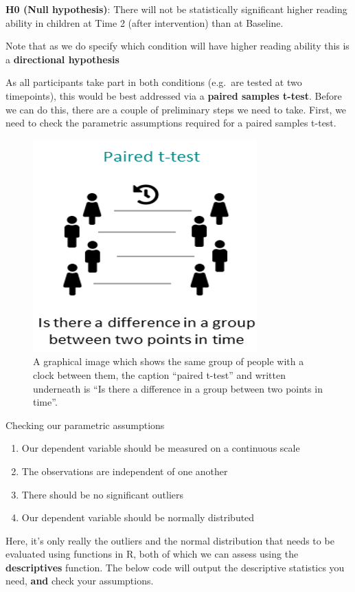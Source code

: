 \documentclass[
]{book}
\begin{document}
\textbf{H0 (Null hypothesis)}: There will not be statistically significant higher reading ability in children at Time 2 (after intervention) than at Baseline.

Note that as we do specify which condition will have higher reading ability this is a \textbf{directional hypothesis}

As all participants take part in both conditions (e.g.~are tested at two timepoints), this would be best addressed via a \textbf{paired samples t-test}. Before we can do this, there are a couple of preliminary steps we need to take. First, we need to check the parametric assumptions required for a paired samples t-test.

\begin{figure}
\centering
\includegraphics{img/05-PairedT-Test.png}
\caption{A graphical image which shows the same group of people with a clock between them, the caption ``paired t-test'' and written underneath is ``Is there a difference in a group between two points in time''.}
\end{figure}

Checking our parametric assumptions

\begin{enumerate}
\def\labelenumi{\alph{enumi}.}
\item
  Our dependent variable should be measured on a continuous scale
\item
  The observations are independent of one another
\item
  There should be no significant outliers
\item
  Our dependent variable should be normally distributed
\end{enumerate}

Here, it's only really the outliers and the normal distribution that needs to be evaluated using functions in R, both of which we can assess using the \textbf{descriptives} function. The below code will output the descriptive statistics you need, \textbf{and} check your assumptions.
\end{document}
